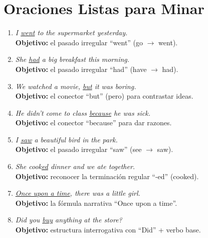 \documentclass[12pt,a4paper]{article}
\begin{document}
\section{Oraciones Listas para Minar}

\begin{cajamineria}

\begin{enumerate}[leftmargin=1.2cm]
  \item \textit{I \underline{went} to the supermarket yesterday.}\\
    {\small\textbf{Objetivo:} el pasado irregular ``went'' (go $\rightarrow$ went).}

  \item \textit{She \underline{had} a big breakfast this morning.}\\
    {\small\textbf{Objetivo:} el pasado irregular ``had'' (have $\rightarrow$ had).}

  \item \textit{We watched a movie, \underline{but} it was boring.}\\
    {\small\textbf{Objetivo:} el conector ``but'' (pero) para contrastar ideas.}

  \item \textit{He didn't come to class \underline{because} he was sick.}\\
    {\small\textbf{Objetivo:} el conector ``because'' para dar razones.}

  \item \textit{I \underline{saw} a beautiful bird in the park.}\\
    {\small\textbf{Objetivo:} el pasado irregular ``saw'' (see $\rightarrow$ saw).}

  \item \textit{She cook\underline{ed} dinner and we ate together.}\\
    {\small\textbf{Objetivo:} reconocer la terminación regular ``-ed'' (cooked).}

  \item \textit{\underline{Once upon a time}, there was a little girl.}\\
    {\small\textbf{Objetivo:} la fórmula narrativa ``Once upon a time''.}

  \item \textit{Did you \underline{buy} anything at the store?}\\
    {\small\textbf{Objetivo:} estructura interrogativa con ``Did'' + verbo base.}


\end{enumerate}
\end{cajamineria}
\end{document}
